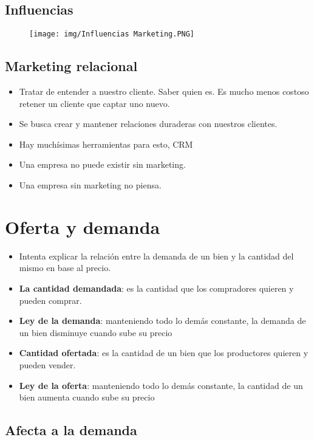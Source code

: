 \documentclass[titlepage,a4paper]{article}
\begin{document}
\subsection{Influencias}

\begin{figure}[!htb]
    \centering
    \texttt{[image: img/Influencias Marketing.PNG]}
\end{figure}


\subsection{Marketing relacional}
\begin{itemize}
\item Tratar de entender a nuestro cliente. Saber quien es. Es mucho menos costoso retener un cliente que captar uno nuevo.
\item Se busca crear y mantener relaciones duraderas con nuestros clientes.
\item Hay muchísimas herramientas para esto, CRM
\item Una empresa no puede existir sin marketing. 
\item Una empresa sin marketing no piensa.
\end{itemize}


\section{Oferta y demanda}

\begin{itemize}
\item Intenta explicar la relación entre la demanda de un bien y la cantidad del mismo en base al precio.
\item \textbf{La cantidad demandada}: es la cantidad que los compradores quieren y pueden comprar.
\item \textbf{Ley de la demanda}: manteniendo todo lo demás constante, la demanda de un bien disminuye cuando sube su precio
\item \textbf{Cantidad ofertada}: es la cantidad de un bien que los productores quieren y pueden vender.
\item \textbf{Ley de la oferta}: manteniendo todo lo demás constante, la cantidad de un bien aumenta cuando sube su precio
\end{itemize}

\subsection*{Afecta a la demanda}
\end{document}
